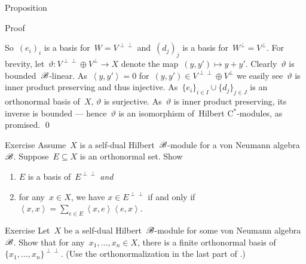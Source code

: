 \documentclass[b]{subfiles}
\begin{document}
\begin{parsec}
\begin{point}{Proposition}
\begin{point}{Proof}
\begin{point}%
So~$(e_i)_i$ is a basis for~$W = V^{\perp\perp}$
    and~$(d_j)_j$ is a basis for~$W^\perp = V^\perp$.
For brevity, let~$\vartheta\colon V^{\perp\perp} \oplus V^\perp \to X$
    denote the map~$(y,y') \mapsto y+y'$.
Clearly~$\vartheta$ is bounded~$\mathscr{B}$-linear.
As~$\left<y,y'\right> = 0$ for~$(y,y') \in V^{\perp\perp} \oplus V^\perp$
    we easily see~$\vartheta$ is inner product preserving and thus injective.
As~$\{e_i\}_{i \in I} \cup \{d_j\}_{j \in J}$
    is an orthonormal basis of~$X$, $\vartheta$ is surjective.
As~$\vartheta$ is inner product preserving, its inverse is bounded
    --- hence~$\vartheta$ is an isomorphism of~Hilbert C$^*$-modules,
    as promised.
    \qed
\end{point}
\end{point}
\end{point}
\begin{point}{Exercise}%
Assume~$X$ is a self-dual Hilbert~$\mathscr{B}$-module for a von Neumann
    algebra~$\mathscr{B}$.
Suppose~$E \subseteq X$ is an orthonormal set. Show
\begin{enumerate}
\item
    $E$ is a basis of~$E^{\perp\perp}$ \emph{and}
\item
    for any~$x \in X$,
        we have
    $x \in E^{\perp\perp}$
    if and only if~$\left<x,x\right> = \sum_{e \in E} \left<x,e\right>
                \left<e,x\right>$.
\end{enumerate}

\end{point}
\begin{point}{Exercise}%
Let~$X$ be a self-dual Hilbert~$\mathscr{B}$-module for some von Neumann
    algebra~$\mathscr{B}$.
Show that for any~$x_1, \ldots, x_n \in X$,
    there is a finite orthonormal basis
    of~$\{x_1, \ldots, x_n\}^{\perp\perp}$.
(Use the orthonormalization in the last part of .)
\end{point}
\end{parsec}
\end{document}
